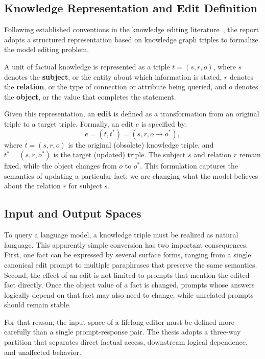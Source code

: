 \subsection{Knowledge Representation and Edit Definition}

Following established conventions in the knowledge editing literature~\cite{wang2024knowledge,meng2022mass,meng2022locating,fang2024alphaedit,liu2025edit}, the report adopts a structured representation based on knowledge graph triples to formalize the model editing problem.

A unit of factual knowledge is represented as a triple $t = (s, r, o)$, where $s$ denotes the \textbf{subject}, or the entity about which information is stated, $r$ denotes the \textbf{relation}, or the type of connection or attribute being queried, and $o$ denotes the \textbf{object}, or the value that completes the statement.

Given this representation, an \textbf{edit} is defined as a transformation from an original triple to a target triple. Formally, an edit $e$ is specified by:
\begin{equation}
e = (t, t^*) = (s, r, o \rightarrow o^*),
\end{equation}
where $t = (s, r, o)$ is the original (obsolete) knowledge triple, and $t^* = (s, r, o^*)$ is the target (updated) triple. The subject $s$ and relation $r$ remain fixed, while the object changes from $o$ to $o^*$. This formulation captures the semantics of updating a particular fact: we are changing what the model believes about the relation $r$ for subject $s$.


\subsection{Input and Output Spaces}

To query a language model, a knowledge triple must be realized as natural language. This apparently simple conversion has two important consequences. First, one fact can be expressed by several surface forms, ranging from a single canonical edit prompt to multiple paraphrases that preserve the same semantics. Second, the effect of an edit is not limited to prompts that mention the edited fact directly. Once the object value of a fact is changed, prompts whose answers logically depend on that fact may also need to change, while unrelated prompts should remain stable.

For that reason, the input space of a lifelong editor must be defined more carefully than a single prompt-response pair. The thesis adopts a three-way partition that separates direct factual access, downstream logical dependence, and unaffected behavior.


